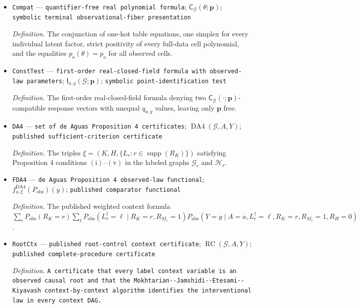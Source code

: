 \documentclass{article}
\begin{document}
\begin{itemize}
  \item \texttt{Compat} --- \texttt{quantifier-\allowbreak{}free real polynomial formula}; \(\mathsf C_{\mathcal G}(\theta;\mathbf p)\); \texttt{symbolic terminal observational-\allowbreak{}fiber presentation}
  \par\smallskip\noindent\emph{Definition.} The conjunction of one-hot table equations, one simplex for every individual latent factor, strict positivity of every full-data cell polynomial, and the equalities \(p_o(\theta)=p_o\) for all observed cells.
  \item \texttt{ConstTest} --- \texttt{first-\allowbreak{}order real-\allowbreak{}closed-\allowbreak{}field formula with observed-\allowbreak{}law parameters}; \(\mathsf I_{a,y}(\mathcal G;\mathbf p)\); \texttt{symbolic point-\allowbreak{}identification test}
  \par\smallskip\noindent\emph{Definition.} The first-order real-closed-field formula denying two \(\mathsf C_{\mathcal G}(\cdot;\mathbf p)\)-compatible response vectors with unequal \(q_{a,y}\) values, leaving only \(\mathbf p\) free.
  \item \texttt{DA4} --- \texttt{set of de Aguas Proposition 4 certificates}; \(\operatorname{DA4}(\mathcal G,A,Y)\); \texttt{published sufficient-\allowbreak{}criterion certificate}
  \par\smallskip\noindent\emph{Definition.} The triples \(\xi=(K,H,\{L_r:r\in\operatorname{supp}(R_K)\})\) satisfying Proposition 4 conditions \(\mathrm{(i)}\)--\(\mathrm{(v)}\) in the labeled graphs \(\mathcal G_r\) and \(\mathcal H_r\).
  \item \texttt{FDA4} --- \texttt{de Aguas Proposition 4 observed-\allowbreak{}law functional}; \(f^{\mathrm{DA4}}_{a,\xi}(P_{\mathrm{obs}})(y)\); \texttt{published comparator functional}
  \par\smallskip\noindent\emph{Definition.} The published weighted context formula \(\sum_r P_{\mathrm{obs}}(R_K=r)\sum_{\ell}P_{\mathrm{obs}}(L_r^{\dagger}=\ell\mid R_K=r,R_{M_r}=1)P_{\mathrm{obs}}(Y=y\mid A=a,L_r^{\dagger}=\ell,R_K=r,R_{M_r}=1,R_H=0)\).
  \item \texttt{RootCtx} --- \texttt{published root-\allowbreak{}control context certificate}; \(\operatorname{RC}(\mathcal G,A,Y)\); \texttt{published complete-\allowbreak{}procedure certificate}
  \par\smallskip\noindent\emph{Definition.} \texttt{A certificate that every label context variable is an observed causal root and that the Mokhtarian-\allowbreak{}-\allowbreak{}Jamshidi-\allowbreak{}-\allowbreak{}Etesami-\allowbreak{}-\allowbreak{}Kiyavash context-\allowbreak{}by-\allowbreak{}context algorithm identifies the interventional law in every context DAG.}

\end{itemize}
\end{document}

